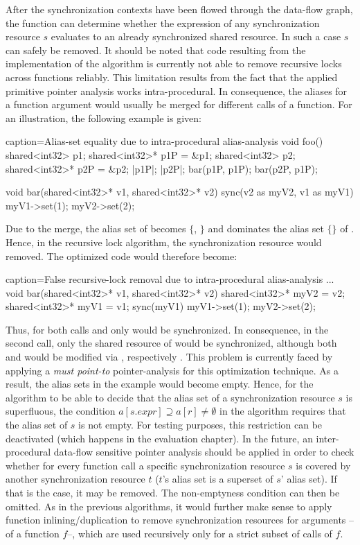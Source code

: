 After the synchronization contexts have been flowed through the data-flow graph, the function can determine whether the expression of any synchronization resource $s$ evaluates to an already synchronized shared resource. In such a case $s$ can safely be removed. It should be noted that code resulting from the implementation of the algorithm is currently not able to remove recursive locks across functions reliably. This limitation results from the fact that the applied primitive pointer analysis works intra-procedural. In consequence, the aliases for a function argument would usually be merged for different calls of a function. For an illustration, the following example is given:
\begin{ccode}{caption=Alias-set equality due to intra-procedural alias-analysis}
void foo() {
  shared<int32> p1; 
  shared<int32>* p1P = &p1; 
  shared<int32> p2; 
  shared<int32>* p2P = &p2;
  |p1P|; 
  |p2P|;
  bar(p1P, p1P);
  bar(p2P, p1P);
}

void bar(shared<int32>* v1, shared<int32>* v2) { 
  sync(v2 as myV2, v1 as myV1) { 
    myV1->set(1); 
    myV2->set(2); 
  } 
}
\end{ccode}
Due to the merge, the alias set of  becomes $\{$, $\}$ and dominates the alias set $\{$$\}$ of . Hence, in the recursive lock algorithm, the synchronization resource  would removed. The optimized code would therefore become:
\begin{ccode}{caption=False recursive-lock removal due to intra-procedural alias-analysis}
...
void bar(shared<int32>* v1, shared<int32>* v2) { 
  shared<int32>* myV2 = v2; 
  shared<int32>* myV1 = v1;
  sync(myV1) { 
    myV1->set(1); 
    myV2->set(2); 
  } 
}
\end{ccode}
Thus, for both calls  and  only  would be synchronized. In consequence, in the second call, only the shared resource of  would be synchronized, although both  and  would be modified via , respectively . This problem is currently faced by applying a \textit{must point-to} pointer-analysis for this optimization technique. As a result, the alias sets in the example would become empty. Hence, for the algorithm to be able to decide that the alias set of a synchronization resource $s$ is superfluous, the condition $a[s.\mathit{expr}] \supseteq a[r] \neq \emptyset$ in the algorithm requires that the alias set of $s$ is not empty. For testing purposes, this restriction can be deactivated (which happens in the evaluation chapter). In the future, an inter-procedural data-flow sensitive pointer analysis should be applied in order to check whether for every function call a specific synchronization resource $s$ is covered by another synchronization resource $t$ ($t$'s alias set is a superset of $s$' alias set). If that is the case, it may be removed. The non-emptyness condition can then be omitted. As in the previous algorithms, it would further make sense to apply function inlining/duplication to remove synchronization resources for arguments -- of a function $f$--, which are used recursively only for a strict subset of calls of $f$. 

